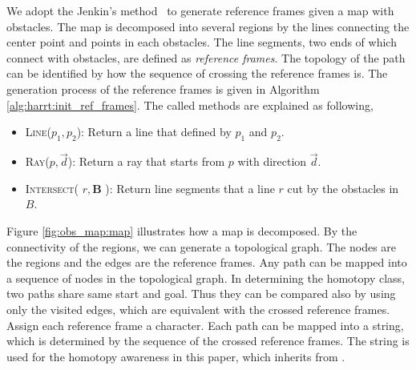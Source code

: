\documentclass[letterpaper, 10 pt, conference]{ieeeconf}
\begin{document}
We adopt the Jenkin's method~\cite{Hernandez201544} to generate reference frames given a map with obstacles.
The map is decomposed into several regions by the lines connecting the center point and points in each obstacles.
The line segments, two ends of which connect with obstacles, are defined as \emph{reference frames}.
The topology of the path can be identified by how the sequence of crossing the reference frames is.
The generation process of the reference frames is given in Algorithm \ref{alg:harrt:init_ref_frames}.
The called methods are explained as following,
\begin{itemize}
	\item \textsc{Line}($ p_{1}, p_{2} $):
	Return a line that defined by $ p_{1} $ and $ p_{2} $.
	\item \textsc{Ray}($ p, \vec{d} $):
	Return a ray that starts from $ p $ with direction $ \vec{d}  $.
	\item \textsc{Intersect}( $ r , \bm{B} $ ):
	Return line segments that a line $ r $ cut by the obstacles in $ B $.
\end{itemize}

Figure \ref{fig:obs_map:map} illustrates how a map is decomposed.
By the connectivity of the regions, we can generate a topological graph.
The nodes are the regions and the edges are the reference frames.
Any path can be mapped into a sequence of nodes in the topological graph.
In determining the homotopy class, two paths share same start and goal.
Thus they can be compared also by using only the visited edges, which are equivalent with the crossed reference frames.
Assign each reference frame a character.
Each path can be mapped into a string, which is determined by the sequence of the crossed reference frames.
The string is used for the homotopy awareness in this paper, which inherits from \cite{Hernandez201544}.
\end{document}
